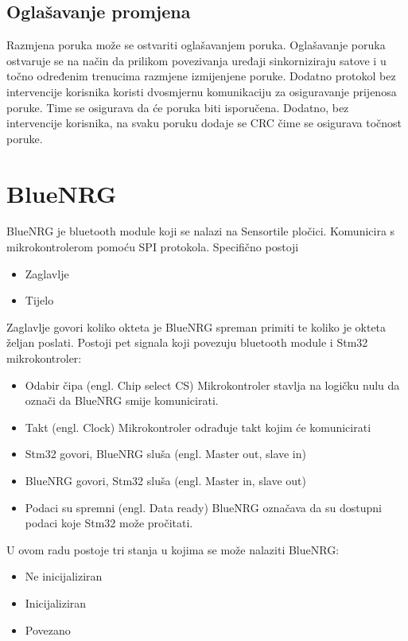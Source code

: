 \documentclass[times, utf8, diplomski]{diplomski}
\begin{document}
\subsection {Oglašavanje promjena}
Razmjena poruka može se ostvariti oglašavanjem poruka. Oglašavanje poruka ostvaruje se na način da prilikom povezivanja uređaji sinkorniziraju satove i u točno određenim trenucima razmjene izmijenjene poruke. Dodatno protokol bez intervencije korisnika koristi dvosmjernu komunikaciju za osiguravanje prijenosa poruke. Time se osigurava da će poruka biti isporučena. Dodatno, bez intervencije korisnika, na svaku poruku dodaje se CRC čime se osigurava točnost poruke.

\section{BlueNRG}
BlueNRG je bluetooth module koji se nalazi na Sensortile pločici. Komunicira s mikrokontrolerom pomoću SPI protokola.
Specifično postoji

\begin{itemize}
  \item Zaglavlje
  \item Tijelo
\end{itemize}

Zaglavlje govori koliko okteta je BlueNRG spreman primiti te koliko je okteta željan poslati.
Postoji pet signala koji povezuju bluetooth module i Stm32 mikrokontroler:

\begin{itemize}
  \item Odabir čipa (engl. Chip select CS) Mikrokontroler stavlja na logičku nulu da označi da BlueNRG smije komunicirati.
  \item Takt (engl. Clock) Mikrokontroler odrađuje takt kojim će komunicirati
  \item Stm32 govori, BlueNRG sluša (engl. Master out, slave in)
  \item BlueNRG govori, Stm32 sluša (engl. Master in, slave out)
  \item Podaci su spremni (engl. Data ready) BlueNRG označava da su dostupni podaci koje Stm32 može pročitati.
\end{itemize}

U ovom radu postoje tri stanja u kojima se može nalaziti BlueNRG:

\begin{itemize}
  \item Ne inicijaliziran
  \item Inicijaliziran
  \item Povezano
\end{itemize}
\end{document}
